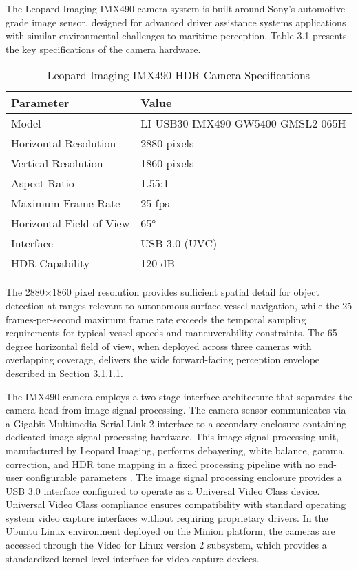 \documentclass{erauthesis}
\begin{document}
The Leopard Imaging IMX490 camera system is built around Sony's automotive-grade image sensor, designed for advanced driver assistance systems applications with similar environmental challenges to maritime perception.
Table 3.1 presents the key specifications of the camera hardware.

\begin{table}[h]
\centering
\caption{Leopard Imaging IMX490 HDR Camera Specifications}
\begin{tabular}{ll}
\hline
\textbf{Parameter} & \textbf{Value} \\
\hline
Model & LI-USB30-IMX490-GW5400-GMSL2-065H \\
Horizontal Resolution & 2880 pixels \\
Vertical Resolution & 1860 pixels \\
Aspect Ratio & 1.55:1 \\
Maximum Frame Rate & 25 fps \\
Horizontal Field of View & 65° \\
Interface & USB 3.0 (UVC) \\
HDR Capability & 120 dB \\
\hline
\end{tabular}
\label{tab:hdr_camera_specs}
\end{table}

The 2880×1860 pixel resolution provides sufficient spatial detail for object detection at ranges relevant to autonomous surface vessel navigation, while the 25 frames-per-second maximum frame rate exceeds the temporal sampling requirements for typical vessel speeds and maneuverability constraints.
The 65-degree horizontal field of view, when deployed across three cameras with overlapping coverage, delivers the wide forward-facing perception envelope described in Section 3.1.1.1.

The IMX490 camera employs a two-stage interface architecture that separates the camera head from image signal processing.
The camera sensor communicates via a Gigabit Multimedia Serial Link 2 interface to a secondary enclosure containing dedicated image signal processing hardware.
This image signal processing unit, manufactured by Leopard Imaging, performs debayering, white balance, gamma correction, and \ac{HDR} tone mapping in a fixed processing pipeline with no end-user configurable parameters \cite{thompson2023}.
The image signal processing enclosure provides a USB 3.0 interface configured to operate as a Universal Video Class device.
Universal Video Class compliance ensures compatibility with standard operating system video capture interfaces without requiring proprietary drivers.
In the Ubuntu Linux environment deployed on the Minion platform, the cameras are accessed through the Video for Linux version 2 subsystem, which provides a standardized kernel-level interface for video capture devices.
\end{document}

